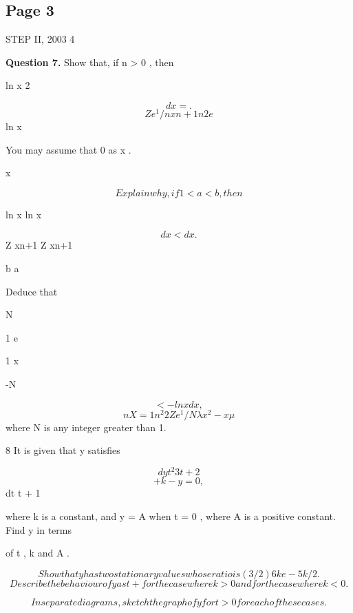 \documentclass[12pt]{article}
\begin{document}
\subsection*{Page 3}
\begin{flushleft}
STEP II, 2003 4\par
\bigskip\textbf{Question 7.} Show that, if n > 0 , then\par
\infty\par
ln x 2\par
\[dx = .\]
\[Z e^1/n xn+1 n2e\]
ln x\par
You may assume that 0 as x .\par
x \to \to \infty\par
\[Explain why, if 1 < a < b , then\]
\infty \infty\par
ln x ln x\par
\[dx < dx .\]
Z xn+1 Z xn+1\par
b a\par
Deduce that\par
N\par
1 e\par
\infty\par
1 x\par
-N\par
\[< - ln x dx ,\]
\[nX=1 n^2 2 Z e^1/N \lambda x^2 - x \mu\]
where N is any integer greater than 1.\par
8 It is given that y satisfies\par
\[dy t^2 3t + 2\]
\[+ k - y = 0 ,\]
dt \lambda t + 1 \mu\par
where k is a constant, and y = A when t = 0 , where A is a positive constant. Find y in terms\par
of t , k and A .\par
\[Show that y has two stationary values whose ratio is (3/2)6ke -5k/2.\]
\[Describe the behaviour of y as t + for the case where k > 0 and for the case where k < 0 .\]
\to \infty\par
\[In separate diagrams, sketch the graph of y for t > 0 for each of these cases.\]
\end{flushleft}
\end{document}
